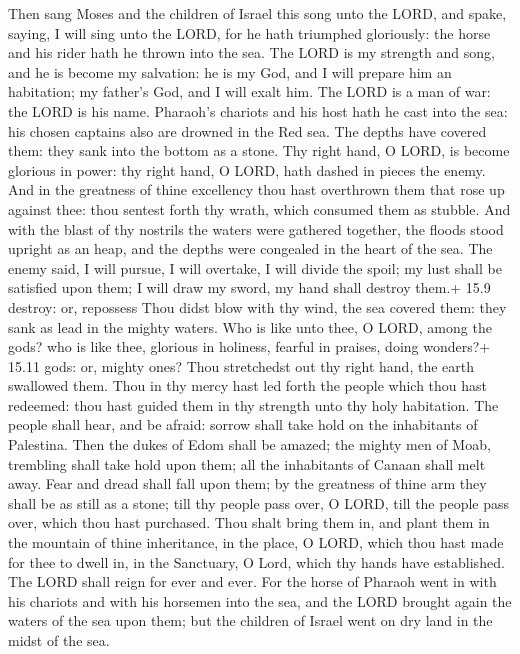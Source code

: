  Then sang Moses and the children of Israel this song unto
the LORD, and spake, saying, I will sing unto the LORD, for he hath
triumphed gloriously: the horse and his rider hath he thrown into the
sea.  The LORD is my strength and song, and he is become my
salvation: he is my God, and I will prepare him an habitation; my
father's God, and I will exalt him.  The LORD is a man of
war: the LORD is his name.  Pharaoh's chariots and his host
hath he cast into the sea: his chosen captains also are drowned in the
Red sea.  The depths have covered them: they sank into the
bottom as a stone.  Thy right hand, O LORD, is become
glorious in power: thy right hand, O LORD, hath dashed in pieces the
enemy.  And in the greatness of thine excellency thou hast
overthrown them that rose up against thee: thou sentest forth thy wrath,
which consumed them as stubble.  And with the blast of thy
nostrils the waters were gathered together, the floods stood upright as
an heap, and the depths were congealed in the heart of the sea.
 The enemy said, I will pursue, I will overtake, I will
divide the spoil; my lust shall be satisfied upon them; I will draw my
sword, my hand shall destroy them.+ 15.9 destroy: or, repossess
 Thou didst blow with thy wind, the sea covered them: they
sank as lead in the mighty waters.  Who is like unto thee,
O LORD, among the gods? who is like thee, glorious in holiness, fearful
in praises, doing wonders?+ 15.11 gods: or, mighty ones? 
Thou stretchedst out thy right hand, the earth swallowed them.
 Thou in thy mercy hast led forth the people which thou
hast redeemed: thou hast guided them in thy strength unto thy holy
habitation.  The people shall hear, and be afraid: sorrow
shall take hold on the inhabitants of Palestina.  Then the
dukes of Edom shall be amazed; the mighty men of Moab, trembling shall
take hold upon them; all the inhabitants of Canaan shall melt away.
 Fear and dread shall fall upon them; by the greatness of
thine arm they shall be as still as a stone; till thy people pass over,
O LORD, till the people pass over, which thou hast purchased.
 Thou shalt bring them in, and plant them in the mountain
of thine inheritance, in the place, O LORD, which thou hast made for
thee to dwell in, in the Sanctuary, O Lord, which thy hands have
established.  The LORD shall reign for ever and ever.
 For the horse of Pharaoh went in with his chariots and
with his horsemen into the sea, and the LORD brought again the waters of
the sea upon them; but the children of Israel went on dry land in the
midst of the sea.

